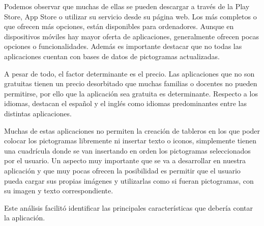 Podemos observar que muchas de ellas se pueden descargar a través de la Play Store, App Store o utilizar su servicio desde su página web. Los más completos o que ofrecen más opciones, están disponibles para ordenadores. Aunque en dispositivos móviles hay mayor oferta de aplicaciones, generalmente ofrecen pocas opciones o funcionalidades. Además es importante destacar que no todas las aplicaciones cuentan con bases de datos de pictogramas actualizadas.

A pesar de todo, el factor determinante es el precio. Las aplicaciones que no son gratuitas tienen un precio desorbitado que muchas familias o docentes no pueden permitirse, por ello que la aplicación sea gratuita es determinante. Respecto a los idiomas, destacan el español y el inglés como idiomas predominantes entre las distintas aplicaciones. 

Muchas de estas aplicaciones no permiten la creación de tableros en los que poder colocar los pictogramas libremente ni insertar texto o iconos, simplemente tienen una cuadrícula donde se van insertando en orden los pictogramas seleccionados por el usuario. Un aspecto muy importante que se va a desarrollar en nuestra aplicación y que muy pocas ofrecen la posibilidad es permitir que el usuario pueda cargar sus propias imágenes y utilizarlas como si fueran pictogramas, con su imagen y texto correspondiente.

Este análisis facilitó identificar las principales características que debería contar la aplicación.







